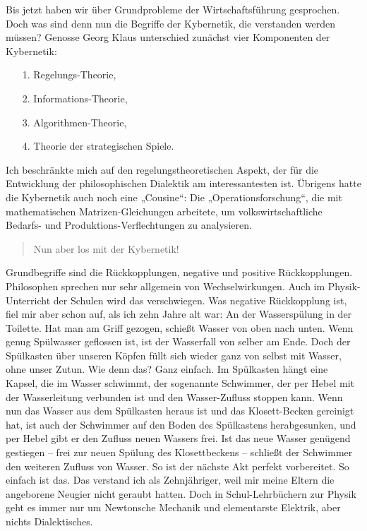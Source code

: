 \documentclass[11pt,a4paper]{article}
\newenvironment{frage}{\begin{quote}}{\end{quote}}
\begin{document}
Bis jetzt haben wir über Grundprobleme der Wirtschaftsführung gesprochen. Doch
was sind denn nun die Begriffe der Kybernetik, die verstanden werden müssen?
Genosse Georg Klaus unterschied zunächst vier Komponenten der Kybernetik:
\begin{itemize}[noitemsep]
\item[1.] Regelungs-Theorie, 
\item[2.] Informations-Theorie,
\item[3.] Algorithmen-Theorie,
\item[4.] Theorie der strategischen Spiele. 
\end{itemize}
Ich beschränkte mich auf den regelungstheoretischen Aspekt, der für die
Entwicklung der philosophischen Dialektik am interessantesten ist. Übrigens
hatte die Kybernetik auch noch eine „Cousine“: Die „Operationsforschung“, die
mit mathematischen Matrizen-Gleichungen arbeitete, um volkswirtschaftliche
Bedarfs- und Produktions-Verflechtungen zu analysieren.

\begin{frage}
  Nun aber los mit der Kybernetik!
\end{frage}
Grundbegriffe sind die Rückkopplungen, negative und positive Rückkopplungen.
Philosophen sprechen nur sehr allgemein von Wechselwirkungen. Auch im
Physik-Unterricht der Schulen wird das verschwiegen. Was negative Rückkopplung
ist, fiel mir aber schon auf, als ich zehn Jahre alt war: An der Wasserspülung
in der Toilette. Hat man am Griff gezogen, schießt Wasser von oben nach unten.
Wenn genug Spülwasser geflossen ist, ist der Wasserfall von selber am Ende.
Doch der Spülkasten über unseren Köpfen füllt sich wieder ganz von selbst mit
Wasser, ohne unser Zutun. Wie denn das?  Ganz einfach. Im Spülkasten hängt
eine Kapsel, die im Wasser schwimmt, der sogenannte Schwimmer, der per Hebel
mit der Wasserleitung verbunden ist und den Wasser-Zufluss stoppen kann. Wenn
nun das Wasser aus dem Spülkasten heraus ist und das Klosett-Becken gereinigt
hat, ist auch der Schwimmer auf den Boden des Spülkastens herabgesunken, und
per Hebel gibt er den Zufluss neuen Wassers frei. Ist das neue Wasser genügend
gestiegen – frei zur neuen Spülung des Klosettbeckens -- schließt der
Schwimmer den weiteren Zufluss von Wasser. So ist der nächste Akt perfekt
vorbereitet. So einfach ist das. Das verstand ich als Zehnjähriger, weil mir
meine Eltern die angeborene Neugier nicht geraubt hatten. Doch in
Schul-Lehrbüchern zur Physik geht es immer nur um Newtonsche Mechanik und
elementarste Elektrik, aber nichts Dialektisches.
\end{document}

